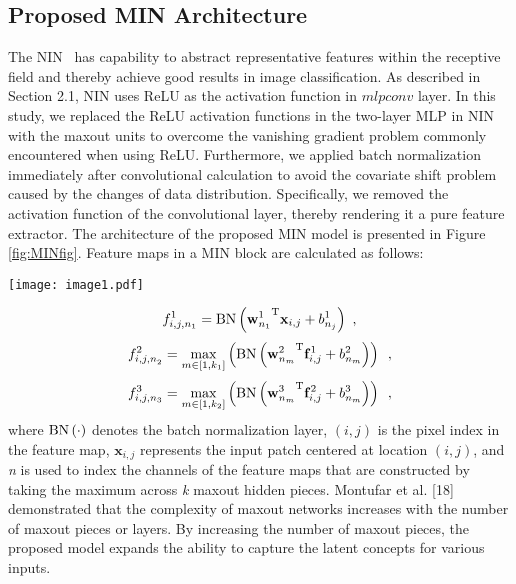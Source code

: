 \documentclass[10pt,twocolumn,letterpaper]{article}
\begin{document}
\subsection{Proposed MIN Architecture}



The NIN~\cite{DBLP:journals/corr/LinCY13} has capability to abstract representative features within the receptive field and thereby achieve good results in image classification. As described in Section 2.1, NIN uses ReLU as the activation function in $mlpconv$ layer. In this study, we replaced the ReLU activation functions in the two-layer MLP in NIN with the maxout units to overcome the vanishing gradient problem commonly encountered when using ReLU. Furthermore, we applied batch normalization immediately after convolutional calculation to avoid the covariate shift problem caused by the changes of data distribution. Specifically, we removed the activation function of the convolutional layer, thereby rendering it a pure feature extractor. The architecture of the proposed MIN model is presented in Figure \ref{fig:MINfig}.  Feature maps in a MIN block are calculated as follows:

\begin{figure*}
\begin{center}
	\texttt{[image: image1.pdf]}
\end{center}
   \caption{The architecture of the proposed MIN model.}
\label{fig:MINfig}
\end{figure*}

\[f^1_{i,j,n_1}={\rm BN}\left({{{\mathbf w}}^1_{n_1}}^{{\rm T}}{{\mathbf x}}_{i,j}+b^1_{n_j}\right)\ ,\] 
\[f^2_{{i,j,n}_2}={\mathop{\max }_{m\in [1,k_1]} \left({\rm BN}\left({{{\mathbf w}}^2_{n_m}}^{{\rm T}}{{\mathbf f}}^1_{i,j}+b^2_{n_m}\right)\right)\ }\ ,\] 
\begin{equation}
f^3_{i,j,n_3}={\mathop{\max }_{m\in [1,k_2]} \left({\rm BN}\left({{{\mathbf w}}^3_{n_m}}^{{\rm T}}{{\mathbf f}}^2_{i,j}+b^3_{n_m}\right)\right)\ }\ ,
\end{equation}
where ${\rm BN}\left(\cdot \right)$ denotes the batch normalization layer, $(i,j)$ is the pixel index in the feature map, ${{\mathbf x}}_{i,j}$ represents the input patch centered at location $(i,j)$, and \textit{n} is used to index the channels of the feature maps that are constructed by taking the maximum across \textit{k} maxout hidden pieces. Montufar et al. [18] demonstrated that the complexity of maxout networks increases with the number of maxout pieces or layers. By increasing the number of maxout pieces, the proposed model expands the ability to capture the latent concepts for various inputs.
\end{document}
